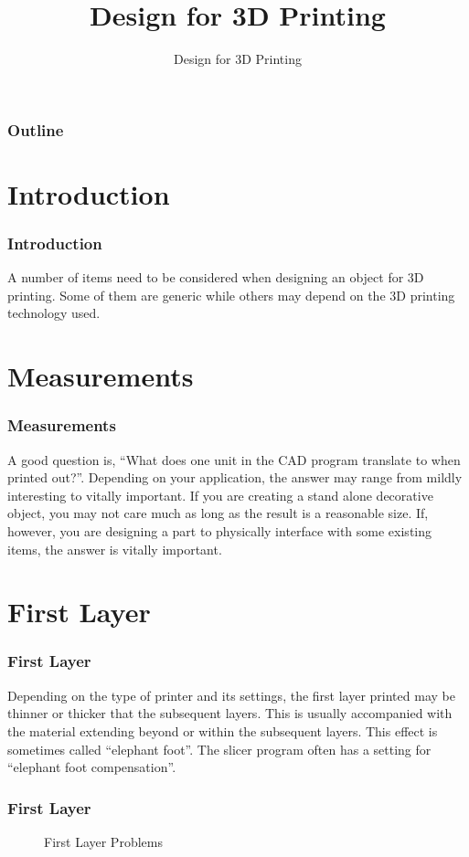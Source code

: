 \documentclass[english,10pt]{beamer}
\title{Design for 3D Printing}
\subtitle{Design for 3D Printing}
\begin{document}
\begin{frame}
  \titlepage
\end{frame}

\begin{frame}
  \frametitle{Outline}
  \tableofcontents
\end{frame}

\section{Introduction}
\begin{frame}
  \frametitle{Introduction}
  A number of items need to be considered when designing an object for 3D printing.  Some of them are generic while others may depend on the 3D printing technology used.
\end{frame}

\section{Measurements}
\begin{frame}
  \frametitle{Measurements}
  A good question is, ``What does one unit in the CAD program translate to when printed out?''.  Depending on your application, the answer may range from mildly interesting to vitally important.  If you are creating a stand alone decorative object, you may not care much as long as the result is a reasonable size.  If, however, you are designing a part to physically interface with some existing items, the answer is vitally important.
\end{frame}

\section{First Layer}
\begin{frame}
  \frametitle{First Layer}
  Depending on the type of printer and its settings, the first layer printed may be thinner or thicker that the subsequent layers.  This is usually accompanied with the material extending beyond or within the subsequent layers.  This effect is sometimes called ``elephant foot''.  The slicer program often has a setting for ``elephant foot compensation''.
\end{frame}
\begin{frame}
  \frametitle{First Layer}
  \begin{figure}
    
    \caption{First Layer Problems}
  \end{figure}
\end{frame}
\end{document}
